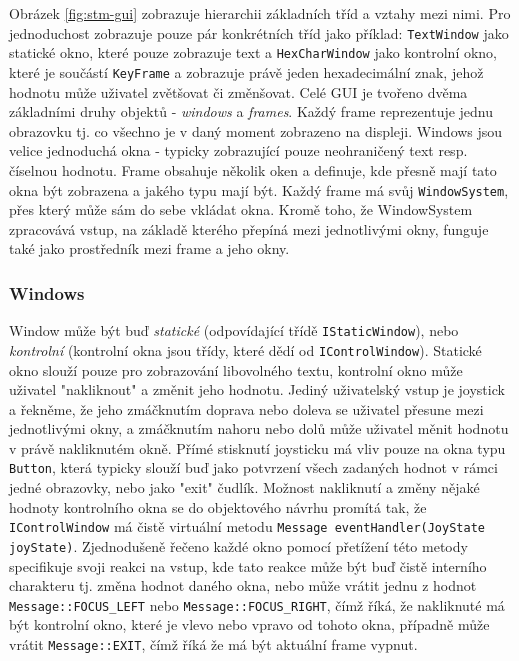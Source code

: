 Obrázek \ref{fig:stm-gui} zobrazuje hierarchii základních tříd a vztahy mezi nimi.
Pro jednoduchost zobrazuje pouze pár konkrétních tříd jako příklad: \texttt{TextWindow} jako statické
okno, které pouze zobrazuje text a \texttt{HexCharWindow} jako kontrolní okno, které je součástí
\texttt{KeyFrame} a zobrazuje právě jeden hexadecimální znak, jehož hodnotu může uživatel
zvětšovat či změnšovat.
Celé GUI je tvořeno dvěma základními druhy objektů - \emph{windows} a \emph{frames}.
Každý frame reprezentuje jednu obrazovku tj. co všechno je v daný moment zobrazeno na displeji.
Windows jsou velice jednoduchá okna - typicky zobrazující pouze neohraničený text resp. číselnou
hodnotu.
Frame obsahuje několik oken a definuje, kde přesně mají tato okna být zobrazena a jakého typu
mají být.
Každý frame má svůj \texttt{WindowSystem}, přes který může sám do sebe vkládat okna.
Kromě toho, že WindowSystem zpracovává vstup, na základě kterého přepíná mezi jednotlivými okny,
funguje také jako prostředník mezi frame a jeho okny.

\subsubsection{Windows}
Window může být buď \emph{statické} (odpovídající třídě \texttt{IStaticWindow}), nebo \emph{kontrolní}
(kontrolní okna jsou třídy, které dědí od \texttt{IControlWindow}).
Statické okno slouží pouze pro zobrazování libovolného textu, kontrolní okno může uživatel "nakliknout"
a změnit jeho hodnotu.
Jediný uživatelský vstup je joystick a řekněme, že jeho zmáčknutím doprava nebo doleva se uživatel
přesune mezi jednotlivými okny, a zmáčknutím nahoru nebo dolů může uživatel měnit hodnotu
v právě nakliknutém okně.
Přímé stisknutí joysticku má vliv pouze na okna typu \texttt{Button}, která typicky slouží buď jako
potvrzení všech zadaných hodnot v rámci jedné obrazovky, nebo jako "exit" čudlík.
Možnost nakliknutí a změny nějaké hodnoty kontrolního okna se do objektového návrhu promítá tak,
že \texttt{IControlWindow} má čistě virtuální metodu \texttt{Message eventHandler(JoyState joyState)}.
Zjednodušeně řečeno každé okno pomocí přetížení této metody specifikuje svoji reakci na vstup,
kde tato reakce může být buď čistě interního charakteru tj. změna hodnot daného okna, nebo může
vrátit jednu z hodnot \texttt{Message::FOCUS\_LEFT} nebo \texttt{Message::FOCUS\_RIGHT}, čímž
říká, že nakliknuté má být kontrolní okno, které je vlevo nebo vpravo od tohoto okna, případně
může vrátit \texttt{Message::EXIT}, čímž říká že má být aktuální frame vypnut.

